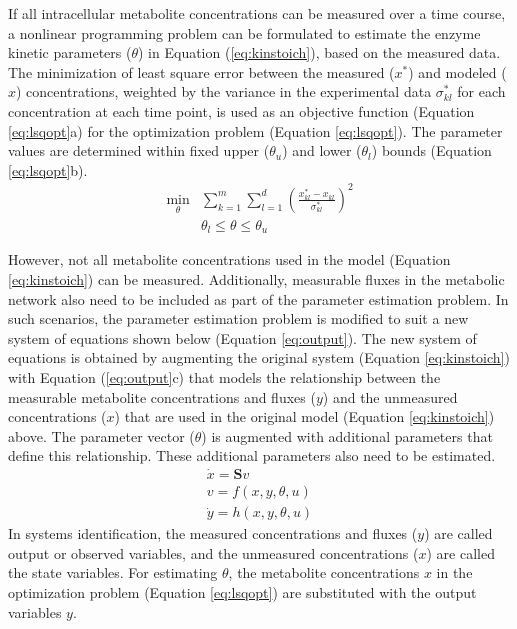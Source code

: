 \documentclass[10pt]{article}
\begin{document}
If all intracellular metabolite concentrations can be measured over a time course, a nonlinear programming problem can be formulated to estimate the enzyme kinetic parameters ($\theta$) in Equation (\ref{eq:kinstoich}), based on the measured data. The minimization of least square error between the measured ($x^*$) and modeled ($x$) concentrations, weighted by the variance in the experimental data $\sigma_{kl}^*$ for each concentration at each time point, is used as an objective function (Equation \ref{eq:lsqopt}a) for the optimization problem (Equation \ref{eq:lsqopt}). The parameter values are determined within fixed upper ($\theta_u$) and lower ($\theta_l$) bounds (Equation \ref{eq:lsqopt}b). 
\begin{subequations}\label{eq:lsqopt}
	\begin{align}
	\underset{\theta}{\mathrm{min}} &\sum_{k=1}^{m}\sum_{l=1}^{d}\left(\frac{x_{kl}^*-x_{kl}}{\sigma_{kl}^*}\right)^2\\
	&\theta_l \le \theta \le \theta_u
	\end{align}
\end{subequations}

However, not all metabolite concentrations used in the model (Equation \ref{eq:kinstoich}) can be measured. Additionally, measurable fluxes in the metabolic network also need to be included as part of the parameter estimation problem. In such scenarios, the parameter estimation problem is modified to suit a new system of equations shown below (Equation \ref{eq:output}). The new system of equations is obtained by augmenting the original system (Equation \ref{eq:kinstoich}) with Equation (\ref{eq:output}c) that models the relationship between the measurable metabolite concentrations and fluxes ($y$) and the unmeasured concentrations ($x$) that are used in the original model (Equation \ref{eq:kinstoich}) above. The parameter vector ($\theta$) is augmented with additional parameters that define this relationship. These additional parameters also need to be estimated.
\begin{subequations}\label{eq:output}
	\begin{align}
	\dot{x} = \mathbf{S}v\\
	v = f(x, y, \theta, u)\\
	\dot{y} = h(x, y, \theta, u)
	\end{align}
\end{subequations}
In systems identification, the measured concentrations and fluxes ($y$) are called output or observed variables, and the unmeasured concentrations ($x$) are called the state variables. For estimating $\theta$, the metabolite concentrations $x$ in the optimization problem (Equation \ref{eq:lsqopt}) are substituted with the output variables $y$. 
\end{document}
